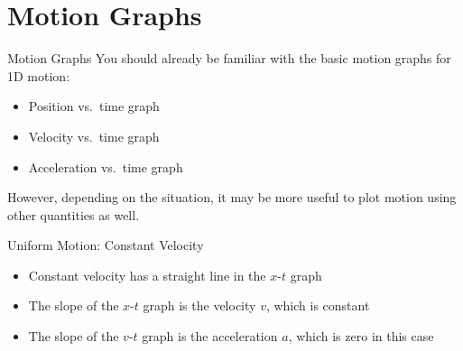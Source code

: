 \documentclass[12pt,compress,aspectratio=169,dvipsnames]{beamer}
\begin{document}
\section{Motion Graphs}

\begin{frame}{Motion Graphs}
  You should already be familiar with the basic motion graphs for 1D motion:
  \begin{itemize}
  \item Position vs.\ time graph
  \item Velocity vs.\ time graph
  \item Acceleration vs.\ time graph
  \end{itemize}

  However, depending on the situation, it may be more useful to plot motion
  using other quantities as well.
\end{frame}



\begin{frame}{Uniform Motion: Constant Velocity}
  \begin{center}
    \hspace{.15in}
    \hspace{.15in}
  \end{center}
  \begin{itemize}
  \item Constant velocity has a straight line in the $x$-$t$ graph
  \item The slope of the $x$-$t$ graph is the velocity $v$, which is constant
  \item The slope of the $v$-$t$ graph is the acceleration $a$, which is zero
    in this case
  \end{itemize}
\end{frame}
\end{document}
